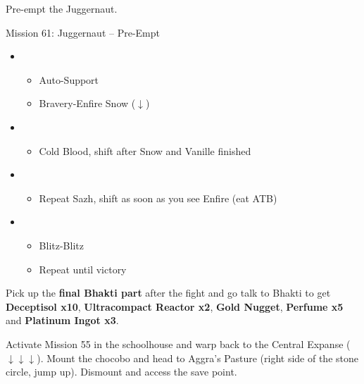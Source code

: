 Pre-empt the Juggernaut.

\begin{battle}{Mission 61: Juggernaut -- Pre-Empt}
	\begin{itemize}
		\item \fourth
			\begin{itemize}
				\item Auto-Support
				\item Bravery-Enfire Snow ($\downarrow$)
			\end{itemize}
		\item \sixth
			\begin{itemize}
				\item Cold Blood, shift after Snow and Vanille finished
			\end{itemize}
		\item \fourth
			\begin{itemize}
				\item Repeat Sazh, shift as soon as you see Enfire (eat ATB)
			\end{itemize}
		\item \first
			\begin{itemize}
				\item Blitz-Blitz
				\item Repeat until victory
			\end{itemize}
	\end{itemize}
\end{battle}

Pick up the \textbf{final Bhakti part} after the fight and go talk to Bhakti to get \textbf{Deceptisol x10}, \textbf{Ultracompact Reactor x2}, \textbf{Gold Nugget}, \textbf{Perfume x5} and \textbf{Platinum Ingot x3}.

Activate Mission 55 in the schoolhouse and warp back to the Central Expanse ($\downarrow\downarrow\downarrow$).
Mount the chocobo and head to Aggra's Pasture (right side of the stone circle, jump up).
Dismount and access the save point.

